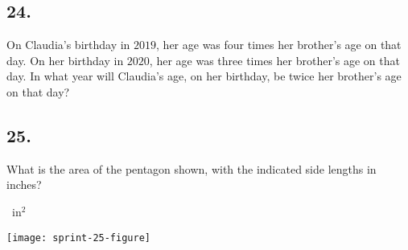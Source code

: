 \documentclass[12pt]{article}
\begin{document}
\subsection*{24.}
On Claudia's birthday in $2019$, her age was four times her brother's age on that day. On her birthday in $2020$, her age was three times her brother's age on that day. In what year will Claudia's age, on her birthday, be twice her brother's age on that day?

\fbox{\phantom{ANSWER}}

\begin{answer}
%
\end{answer}


\subsection*{25.}
What is the area of the pentagon shown, with the indicated side lengths in inches? 

\fbox{\phantom{ANSWER}}~in$^2$

\begin{minipagex}[b]{\linewidth}
\centering
\texttt{[image: sprint-25-figure]}
\end{minipagex}
\end{document}
